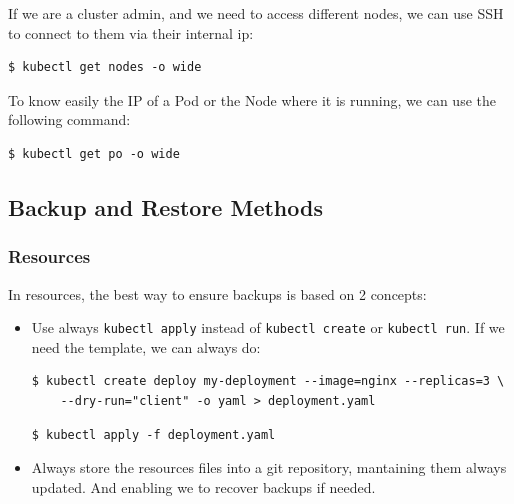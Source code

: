 \documentclass{article}
\newenvironment{blocktemplateI}[1]{%
    \tcolorbox[beamer,%
    noparskip,breakable,
    colframe=Violet,%
    colbacklower=Black,%
    title=#1]}%
    {\endtcolorbox}
\newenvironment{blocktemplateII}[1]{%
    \tcolorbox[beamer,%
    noparskip,breakable,
    colframe=Green,%
    colbacklower=LimeGreen!75!LightGreen,%
    title=#1]}%
    {\endtcolorbox}
\newenvironment{codetemplate}[1][]{%
  \mybasecolorbox[#1]
  \itshape
}{%
  \endmybasecolorbox
}
\begin{document}
\begin{blocktemplateII}{NOTE}
If we are a cluster admin, and we need to access different nodes, we can use SSH to connect to them via their internal ip:
\begin{codetemplate}{}
\begin{verbatim}
$ kubectl get nodes -o wide
\end{verbatim}
\end{codetemplate}
\end{blocktemplateII}

\begin{blocktemplateI}{NOTE}
To know easily the IP of a Pod or the Node where it is running, we can use the following command:
\begin{codetemplate}{}
\begin{verbatim}
$ kubectl get po -o wide
\end{verbatim}
\end{codetemplate}
\end{blocktemplateI}

\subsection{Backup and Restore Methods}
\subsubsection{Resources}
In resources, the best way to ensure backups is based on 2 concepts:
\begin{itemize}
    \item Use always \verb|kubectl apply| instead of \verb|kubectl create| or \verb|kubectl run|. If we need the template, we can always do:
\begin{codetemplate}{}
\begin{verbatim}
$ kubectl create deploy my-deployment --image=nginx --replicas=3 \
    --dry-run="client" -o yaml > deployment.yaml
\end{verbatim}
\end{codetemplate}
\begin{codetemplate}{}
\begin{verbatim}
$ kubectl apply -f deployment.yaml
\end{verbatim}
\end{codetemplate}

    \item Always store the resources files into a git repository, mantaining them always updated. And enabling we to recover backups if needed.
\end{itemize}
\end{document}
